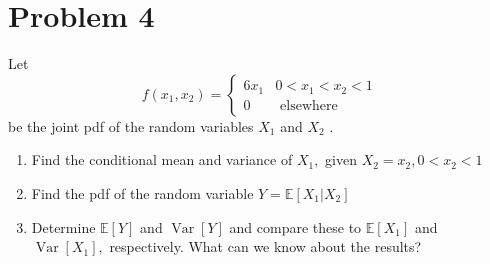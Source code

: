 \documentclass[10pt,a4paper,oneside]{article}
\begin{document}
\section* {Problem 4} 
Let
\[
f\left(x_{1}, x_{2}\right)=\left\{\begin{array}{cc}{6 x_{1}} & {0<x_{1}<x_{2}<1} \\ {0} & {\text { elsewhere }}\end{array}\right.
\]
be the joint pdf of the random variables $X_{1}$ and $X_{2}$ .
\begin{enumerate}
\item Find the conditional mean and variance of $X_{1},$ given $X_{2}=x_{2}, 0<x_{2}<1$
\item Find the pdf of the random variable $Y=\mathbb{E}\left[X_{1} | X_{2}\right]$
\item Determine $\mathbb{E}[Y]$ and $\operatorname{Var}[Y]$ and compare these to $\mathbb{E}\left[X_{1}\right]$ and $\operatorname{Var}\left[X_{1}\right],$ respectively. What can
we know about the results?
\end{enumerate}
\end{document}

